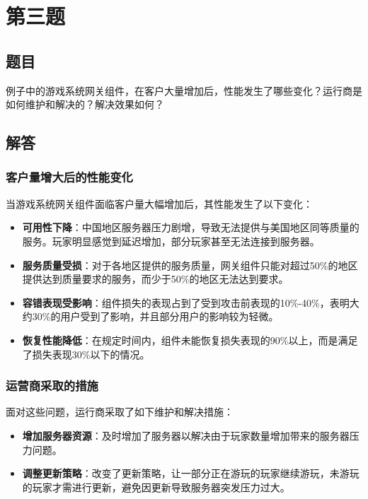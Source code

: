 \documentclass{article}
\begin{document}
\section{第三题}

\subsection{题目}

例子中的游戏系统网关组件，在客户大量增加后，性能发生了哪些变化？运行商是如何维护和解决的？解决效果如何？

\subsection{解答}

\subsubsection{客户量增大后的性能变化}

当游戏系统网关组件面临客户量大幅增加后，其性能发生了以下变化：

\begin{itemize}
	\item \textbf{可用性下降}：中国地区服务器压力剧增，导致无法提供与美国地区同等质量的服务。玩家明显感觉到延迟增加，部分玩家甚至无法连接到服务器。
	\item \textbf{服务质量受损}：对于各地区提供的服务质量，网关组件只能对超过50\%的地区提供达到质量要求的服务，而少于50\%的地区无法达到要求。
	\item \textbf{容错表现受影响}：组件损失的表现占到了受到攻击前表现的10\%-40\%，表明大约30\%的用户受到了影响，并且部分用户的影响较为轻微。
	\item \textbf{恢复性能降低}：在规定时间内，组件未能恢复损失表现的90\%以上，而是满足了损失表现30\%以下的情况。
\end{itemize}

\subsubsection{运营商采取的措施}

面对这些问题，运行商采取了如下维护和解决措施：

\begin{itemize}
	\item \textbf{增加服务器资源}：及时增加了服务器以解决由于玩家数量增加带来的服务器压力问题。
	\item \textbf{调整更新策略}：改变了更新策略，让一部分正在游玩的玩家继续游玩，未游玩的玩家才需进行更新，避免因更新导致服务器突发压力过大。
\end{itemize}
\end{document}

